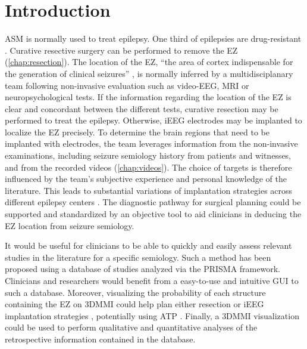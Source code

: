 \section{Introduction}

\Ac{ASM} is normally used to treat epilepsy.
One third of epilepsies are drug-resistant \cite{engel_what_2016}.
Curative resective surgery can be performed to remove the \ac{EZ} (\cref{chap:resection}).
The location of the \ac{EZ}, ``the area of cortex indispensable for the generation of clinical seizures'' \cite{rosenow_presurgical_2001}, is normally inferred by a multidisciplanary team following non-invasive evaluation such as video-\ac{EEG}, \ac{MRI} or neuropsychological tests.
If the information regarding the location of the \ac{EZ} is clear and concordant between the different tests, curative resection may be performed to treat the epilepsy.
Otherwise, \ac{iEEG} electrodes may be implanted to localize the \ac{EZ} precisely.
To determine the brain regions that need to be implanted with electrodes, the team leverages information from the non-invasive examinations, including seizure semiology history from patients and witnesses, and from the recorded videos (\cref{chap:videos}).  %
The choice of targets is therefore influenced by the team's subjective experience and personal knowledge of the literature.
This leads to substantial variations of implantation strategies across different epilepsy centers \cite{tufenkjian_seizure_2012}.
The diagnostic pathway for surgical planning could be supported and standardized by an objective tool to aid clinicians in deducing the \ac{EZ} location from seizure semiology.

It would be useful for clinicians to be able to quickly and easily assess relevant studies in the literature for a specific semiology.
Such a method has been proposed \cite{alim-marvasti_probabilistic_2021} using a database of studies analyzed via the \ac{PRISMA} framework.
Clinicians and researchers would benefit from a easy-to-use and intuitive \ac{GUI} to such a database.
Moreover, visualizing the probability of each structure containing the \ac{EZ} on \ac{3DMMI} could help plan either resection or \ac{iEEG} implantation strategies \cite{nowell_resection_2017, nowell_utility_2015}, potentially using \ac{ATP} \cite{sparks_automated_2017}.
Finally, a \ac{3DMMI} visualization could be used to perform qualitative and quantitative analyses of the retrospective information contained in the \svtdatabase database.

